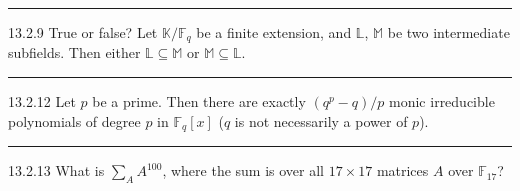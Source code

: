 \documentclass[a4paper, 12pt]{article}
\begin{document}
\noindent\rule{7in}{2.8pt}
\begin{problem}{13.2.9}
True or false? Let \(\mathbb{K}/\mathbb{F}_q\) be a finite extension, and \(\mathbb{L}\), \(\mathbb{M}\) be two intermediate subfields. Then either \(\mathbb{L}\subseteq \mathbb{M}\) or \(\mathbb{M}\subseteq \mathbb{L}\). 
\end{problem}
\begin{solution}

\end{solution}

\noindent\rule{7in}{2.8pt}
\begin{problem}{13.2.12}
Let \(p\) be a prime. Then there are exactly \((q^p-q)/p\) monic irreducible polynomials of degree \(p\) in \(\mathbb{F}_q[x]\) (\(q\) is not necessarily a power of \(p\)).
\end{problem}
\begin{solution}

\end{solution}

\noindent\rule{7in}{2.8pt}
\begin{problem}{13.2.13}
What is \(\sum_A A^{100}\), where the sum is over all \(17\times 17\) matrices \(A\) over \(\mathbb{F}_{17}\)?
\end{problem}
\begin{solution}

\end{solution}
\end{document}
